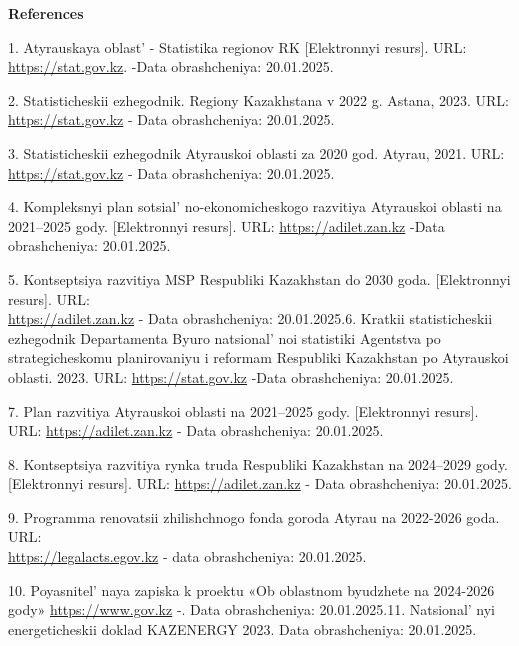 \begin{center}
{\bfseries References}
\end{center}

\begin{references}
1. Atyrauskaya oblast'{} - Statistika regionov RK
{[}Elektronnyi resurs{]}. URL: \href{https://stat.gov.kz/ru/region/atyrau}{https://stat.gov.kz}.
-Data obrash\-cheniya: 20.01.2025.

2. Statisticheskii ezhegodnik. Regiony Kazakhstana v 2022 g. Astana,
2023. URL:
\href{https://stat.gov.kz/ru/publication/collections/?year=2022&name=17195&period=year}{https://stat.gov.kz}
- Data obrashcheniya: 20.01.2025.

3. Statisticheskii ezhegodnik Atyrauskoi oblasti za 2020 god. Atyrau,
2021. URL:
\href{https://stat.gov.kz/ru/region/atyrau/collections/?year=2020&period=year&name=120885}{https://stat.gov.kz}
- Data obrashcheniya: 20.01.2025.

4. Kompleksnyi plan sotsial' no-ekonomicheskogo razvitiya
Atyrauskoi oblasti na 2021--2025 gody. {[}Elek\-tronnyi resurs{]}. URL:
\href{https://adilet.zan.kz/rus/docs/P2100000337}{https://adilet.zan.kz}
-Data obrashcheniya: 20.01.2025.

5. Kontseptsiya razvitiya MSP Respubliki Kazakhstan do 2030 goda.
{[}Elektronnyi resurs{]}. URL:\\
\href{https://adilet.zan.kz/rus/docs/P2300001050/history}{https://adilet.zan.kz} - Data obrashcheniya:
20.01.2025.6. Kratkii statisticheskii ezhegodnik Departamenta Byuro
natsional' noi statistiki Agentstva po strategicheskomu
planirovaniyu i reformam Respubliki Kazakh\-stan po Atyrauskoi oblasti.
2023. URL:
\href{https://stat.gov.kz/ru/region/atyrau/collections/?year=2022&period=year&name=52710}{https://stat.gov.kz}
-Data obrashcheniya: 20.01.2025.

7. Plan razvitiya Atyrauskoi oblasti na 2021--2025 gody. {[}Elektronnyi
resurs{]}. URL: \href{https://adilet.zan.kz/rus/docs/P2100000337}{https://adilet.zan.kz} - Data
obrashcheniya: 20.01.2025.

8. Kontseptsiya razvitiya rynka truda Respubliki Kazakhstan na
2024--2029 gody. {[}Elektronnyi resurs{]}. URL:
\href{https://adilet.zan.kz/rus/docs/P2300001050/history}{https://adilet.zan.kz}
- Data obrashcheniya: 20.01.2025.

9. Programma renovatsii zhilishchnogo fonda goroda Atyrau na 2022-2026
goda. URL:\\
\href{https://legalacts.egov.kz/npa/view?id=14132167}{https://legalacts.egov.kz}
- data obrashcheniya: 20.01.2025.

10. Poyasnitel' naya zapiska k proektu «Ob oblastnom
byudzhete na 2024-2026 gody»
\href{https://www.gov.kz/memleket/entities/atyrau-economy/documents/details/597525?lang=ru}{https://www.gov.kz}
-. Data obrashcheniya:
20.01.2025.11. Natsional' nyi energeticheskii doklad KAZENERGY 2023.
\textsc{\href{https://www.kazenergy.com/ru/operation/ned/2117/.-}{}}
Data obrashcheniya: 20.01.2025.
\end{references}

